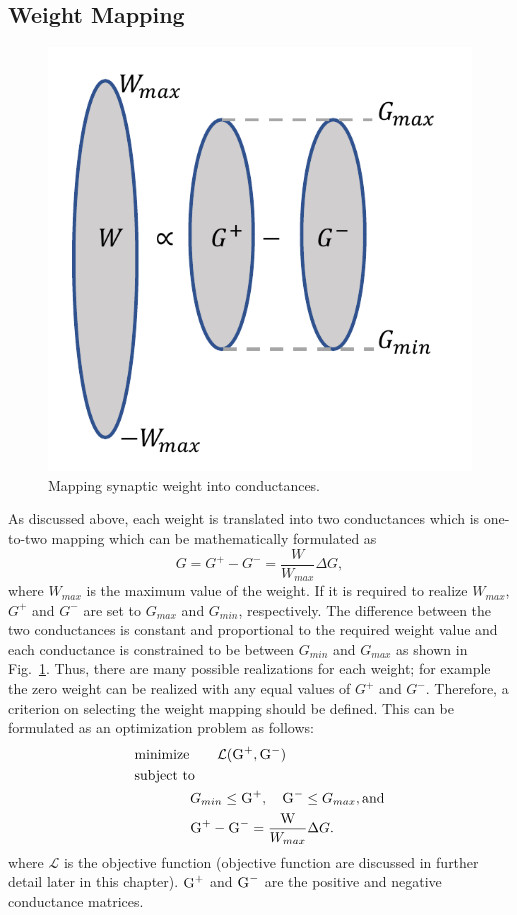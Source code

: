 \documentclass[english]{article}
\newcommand{\reffig}[1]{{Fig.~\ref{#1}}}
\begin{document}
\subsection{Weight Mapping}
\begin{figure}[!h]
\centering
\includegraphics[width=0.35\linewidth,height=0.4\linewidth]{Mapping.pdf}
\caption{\label{fig:mapping}Mapping synaptic weight into conductances.}
\end{figure}
%
As discussed above, each weight is translated into two conductances which is one-to-two mapping which can be mathematically formulated as 
%
\begin{equation}
    G=G^+-G^-=\frac{W}{W_{max}}\Delta G,
\end{equation}
\noindent where $W_{max}$ is the maximum value of the weight. If it is required to realize $W_{max}$, $G^+$ and $G^-$ are set to $G_{max}$ and $G_{min}$, respectively.   
%
The difference between the two conductances is constant and proportional to the required weight value and each conductance is constrained to be between $G_{min}$ and $G_{max}$ as shown in \reffig{fig:mapping}. Thus, there are many possible realizations for each weight; for example the zero weight can be realized with any equal values of $G^+$ and $G^-$. Therefore, a criterion on selecting the weight mapping should be defined. This can be formulated as an optimization problem as follows:
%
\begin{equation}
\begin{aligned}
  & {\text{minimize}} \quad \quad \mathcal{L}(\textsc{G}^+, \textsc{G}^-) \\
&\text{subject to} \\
&  \quad \quad  \quad \quad  G_{min}\leq \textsc{G}^+ ,\quad \textsc{G}^- \leq G_{max}, \text{and} \\ 
&  \quad \quad  \quad \quad \textsc{G}^+ - \textsc{G}^-=\frac{\textsc{W}}{W_{max}}\Delta G.
\end{aligned}
\end{equation}
\noindent where $\mathcal{L}$ is the objective function (objective function are discussed in further detail later in this chapter). $\textsc{G}^+$ and $\textsc{G}^-$ are the positive and negative conductance matrices.   
\end{document}
